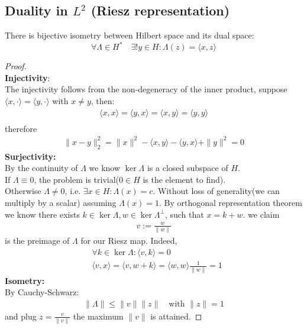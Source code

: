 \subsection{Duality in \texorpdfstring{$L^2$}{L\textasciicircum{}2} (Riesz representation)}
\begin{theorem}
There is bijective isometry between Hilbert space and its dual space:
\begin{equation*}
	\forall \Lambda \in H^* \quad  \exists! y \in H: \Lambda(z) = \langle x, z\rangle
\end{equation*}
\end{theorem}
\begin{proof}\quad\\
\textbf{Injectivity}:\\ The injectivity follows from the non-degeneracy of the inner product, suppose $\langle x, \cdot \rangle = \langle y, \cdot \rangle$ with $x \neq y$, then:
\begin{align*}
	\langle x, x \rangle = \langle y, x \rangle = \langle x, y \rangle = \langle y, y \rangle\\
\end{align*}
therefore
\begin{align*}
	\|x - y\|_2^2 = \|x\|^2 - \langle x, y\rangle - \langle y, x \rangle + \|y\|^2 = 0
\end{align*}
\textbf{Surjectivity:}\\
By the continuity of $\Lambda$ we know $\ker\Lambda$ is a closed subspace of $H$.\\
If $\Lambda \equiv 0$, the problem is trivial($0 \in H$ is the element to find).\\
Otherwise $\Lambda \neq 0$, i.e. $\exists x \in H: \Lambda(x) = c$. Without loss of generality(we can multiply by a scalar) assuming $\Lambda(x) = 1$. By orthogonal representation theorem we know there exists $k \in \ker \Lambda, w \in \ker\Lambda^\perp$, such that $x = k + w$. we claim 
\begin{align*}
	v := \frac{w}{\|w\|}
\end{align*}
is the preimage of $\Lambda$ for our Riesz map. Indeed, 
\begin{align*}
	&\forall k \in \ker \Lambda : \langle v, k \rangle = 0\\
	&\langle v, x\rangle = \langle v, w + k \rangle =  \langle w, w \rangle \frac{1}{\|w\|} = 1
\end{align*}
\textbf{Isometry:}\\
By Cauchy-Schwarz:
\begin{align*}
	\|\Lambda\| \leq \|v\|\|z\| \quad \text{with } \|z\| = 1
\end{align*}
and plug $z = \frac{v}{\|v\|}$ the maximum $\|v\|$ is attained.
\end{proof}

